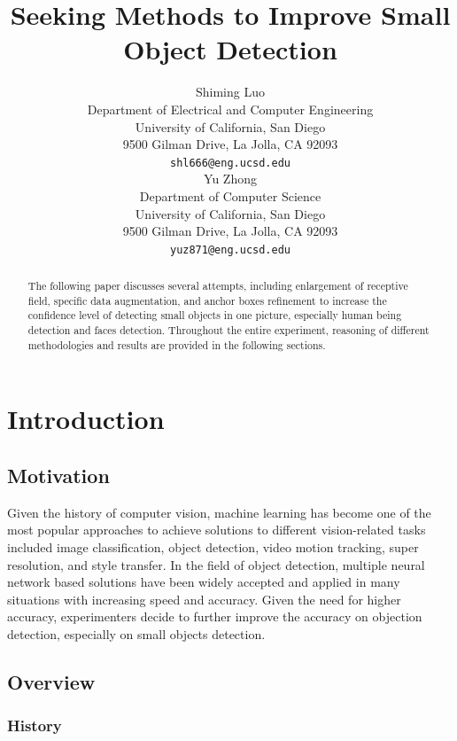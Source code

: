 \documentclass{article}
\title{Seeking Methods to Improve Small Object Detection}
\author{
  Shiming Luo\\
  Department of Electrical and Computer Engineering\\
  University of California, San Diego\\
  9500 Gilman Drive, La Jolla, CA 92093\\
  \texttt{shl666@eng.ucsd.edu} \\
  \And
  Yu Zhong \\
  Department of Computer Science \\
  University of California, San Diego \\
  9500 Gilman Drive, La Jolla, CA 92093\\
  \texttt{yuz871@eng.ucsd.edu} \\
}
\begin{document}

\maketitle

\begin{abstract}
  The following paper discusses several attempts, including enlargement of receptive 
  field, specific data augmentation, and anchor boxes refinement to increase the confidence
  level of detecting small objects in one picture, especially human being detection
  and faces detection. Throughout the entire experiment, reasoning of different
  methodologies and results are provided in the following sections.
\end{abstract}

\section{Introduction}

\subsection{Motivation}
Given the history of computer vision, machine learning has become one of the most popular 
approaches to achieve solutions to different vision-related tasks included image classification, 
object detection, video motion tracking, super resolution, and style transfer. In the field of object 
detection, multiple neural network based solutions have been widely accepted and applied in many 
situations with increasing speed and accuracy. Given the need for higher accuracy, experimenters 
decide to further improve the accuracy on objection detection, especially on small objects detection.

\subsection{Overview}

\subsubsection{History}
\end{document}
